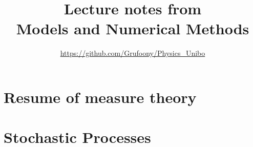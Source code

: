\documentclass[12pt]{article}
\title{Lecture notes from \\ Models and Numerical Methods} \author{\url{https://github.com/Grufoony/Physics_Unibo}}
\date{}
\begin{document}
\maketitle

\newpage
\thispagestyle{empty}
\addtocounter{page}{-2}
\mbox{}

\tableofcontents
\pagebreak


\section{Resume of measure theory}

\pagebreak

\section{Stochastic Processes}

\pagebreak
\end{document}
